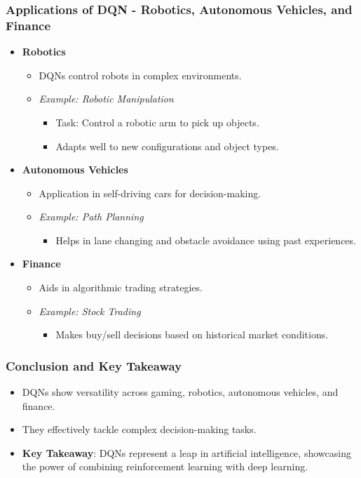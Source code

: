 \documentclass{beamer}
\begin{document}
\begin{frame}[fragile]
    \frametitle{Applications of DQN - Robotics, Autonomous Vehicles, and Finance}
    \begin{itemize}
        \item \textbf{Robotics}
        \begin{itemize}
            \item DQNs control robots in complex environments.
            \item \textit{Example: Robotic Manipulation}
            \begin{itemize}
                \item Task: Control a robotic arm to pick up objects.
                \item Adapts well to new configurations and object types.
            \end{itemize}
        \end{itemize}
        
        \item \textbf{Autonomous Vehicles}
        \begin{itemize}
            \item Application in self-driving cars for decision-making.
            \item \textit{Example: Path Planning}
            \begin{itemize}
                \item Helps in lane changing and obstacle avoidance using past experiences.
            \end{itemize}
        \end{itemize}
        
        \item \textbf{Finance}
        \begin{itemize}
            \item Aids in algorithmic trading strategies.
            \item \textit{Example: Stock Trading}
            \begin{itemize}
                \item Makes buy/sell decisions based on historical market conditions.
            \end{itemize}
        \end{itemize}
    \end{itemize}
\end{frame}

\begin{frame}[fragile]
    \frametitle{Conclusion and Key Takeaway}
    \begin{itemize}
        \item DQNs show versatility across gaming, robotics, autonomous vehicles, and finance.
        \item They effectively tackle complex decision-making tasks.
        \item \textbf{Key Takeaway}: DQNs represent a leap in artificial intelligence, showcasing the power of combining reinforcement learning with deep learning.
    \end{itemize}
\end{frame}
\end{document}

